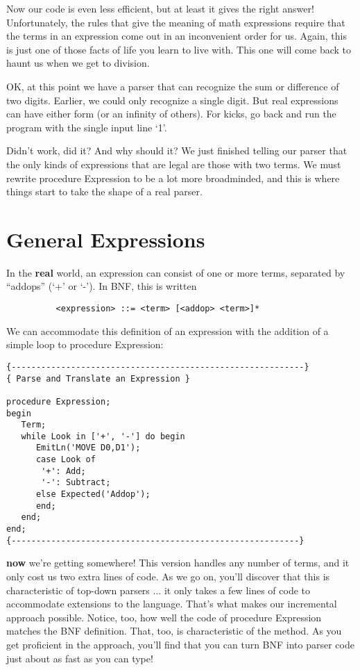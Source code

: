 Now  our  code  is even less efficient, but at least it gives the right answer!  Unfortunately, the  rules that give the meaning of math expressions require that the terms in an expression come out in an inconvenient  order  for  us. Again, this is just one of those facts of life you learn to live with. This  one will come back to haunt us when we get to division.

OK, at this point we have a parser that can recognize the sum or difference of two digits. Earlier, we  could only recognize a single digit. But  real  expressions can have either form (or an infinity of others). For kicks, go back and run the program with the single input line `1'.

Didn't work, did it? And  why  should  it?  We  just finished telling  our  parser  that the only kinds of expressions that are legal are those  with  two  terms. We  must  rewrite procedure Expression to be a lot more broadminded, and this is where things start to take the shape of a real parser.

\section{General Expressions}

In the  {\bfseries real} world, an  expression  can  consist of one or more terms, separated  by  ``addops''  (`+'  or  `-'). In BNF, this is written

\begin{verbatim}
          <expression> ::= <term> [<addop> <term>]*
\end{verbatim}

We  can  accommodate  this definition of an  expression  with  the addition of a simple loop to procedure Expression:

\begin{verbatim}
{-----------------------------------------------------------}
{ Parse and Translate an Expression }

procedure Expression;
begin
   Term;
   while Look in ['+', '-'] do begin
      EmitLn('MOVE D0,D1');
      case Look of
       '+': Add;
       '-': Subtract;
      else Expected('Addop');
      end;
   end;
end;
{----------------------------------------------------------}
\end{verbatim}

{\bfseries now} we're getting somewhere!   This version handles any number of terms, and it only cost us two extra lines of code. As we go on, you'll discover that this is characteristic  of  top-down parsers ... it only takes a few lines of code to accommodate extensions to the  language. That's  what  makes  our  incremental  approach possible. Notice, too, how well the code of procedure Expression matches the BNF definition. That, too, is characteristic of the method. As you get proficient in the approach, you'll  find that you can turn BNF into parser code just about as  fast  as you can type!


